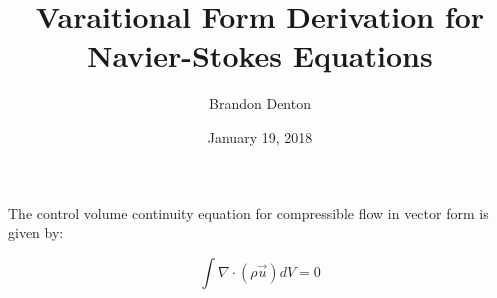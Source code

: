 \documentclass{report}
\begin{document}
\title{Varaitional Form Derivation for Navier-Stokes Equations}
\author{Brandon Denton}
\date{January 19, 2018}


The control volume continuity equation for compressible flow in vector form is given by:

\begin{equation}
\int \nabla \cdot (\rho \vec{u} ) dV = 0
\end{equation}
\end{document}

